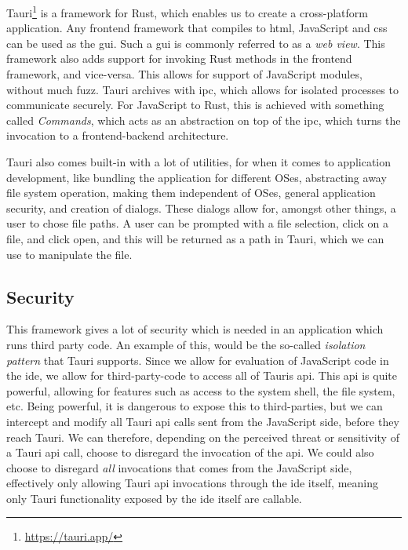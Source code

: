 Tauri\footnote{\url{https://tauri.app/}} is a framework for Rust, which enables
us to create a cross-platform application. Any frontend framework that compiles
to \gls*{html}, JavaScript and \gls*{css} can be used as the \gls*{gui}. Such a
\gls*{gui} is commonly referred to as a \textit{web view}. This framework also
adds support for invoking Rust methods in the frontend framework, and
vice-versa. This allows for support of JavaScript modules, without much fuzz.
Tauri archives with \gls*{ipc}, which allows for isolated processes to
communicate securely. For JavaScript to Rust, this is achieved with something
called \textit{Commands}, which acts as an abstraction on top of the \gls*{ipc},
which turns the invocation to a frontend-backend architecture.

Tauri also comes built-in with a lot of utilities, for when it comes to
application development, like bundling the application for different OSes,
abstracting away file system operation, making them independent of OSes, general
application security, and creation of dialogs. These dialogs allow for, amongst
other things, a user to chose file paths. A user can be prompted with a file
selection, click on a file, and click open, and this will be returned as a path
in Tauri, which we can use to manipulate the file.


\subsection{Security}

This framework gives a lot of security which is needed in an
application which runs third party code. An example of this, would be the
so-called \textit{isolation pattern} that Tauri supports. Since we allow for
evaluation of JavaScript code in the \gls*{ide}, we allow for third-party-code to
access all of Tauris \gls*{api}. This \gls*{api} is quite powerful, allowing for
features such as access to the system shell, the file system, etc. Being
powerful, it is dangerous to expose this to third-parties, but we can
intercept and modify all Tauri \gls*{api} calls sent from the JavaScript side,
before they reach Tauri. We can therefore, depending on the perceived threat or
sensitivity of a Tauri \gls*{api} call, choose to disregard the invocation of the
\gls*{api}. We could also choose to disregard \textit{all} invocations that comes
from the JavaScript side, effectively only allowing Tauri \gls*{api} invocations
through the \gls*{ide} itself, meaning only Tauri functionality exposed by the
\gls*{ide} itself are callable.


